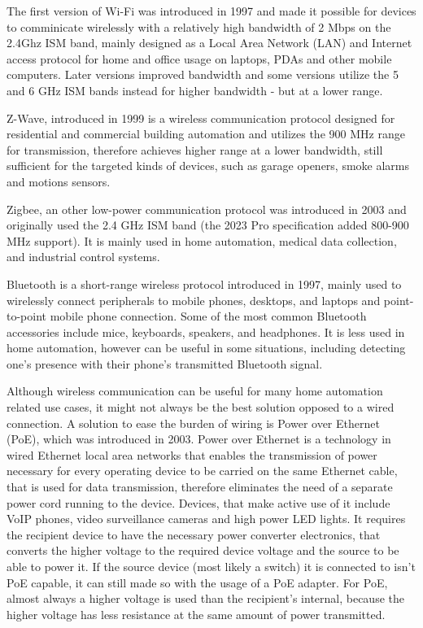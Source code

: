 The first version of Wi-Fi was introduced in 1997 and made it possible for devices to comminicate wirelessly with a relatively high bandwidth of 2 Mbps on the 2.4Ghz ISM band, mainly designed as a Local Area Network (LAN) and Internet access protocol for home and office usage on laptops, PDAs and other mobile computers. Later versions improved bandwidth and some versions utilize the 5 and 6 GHz ISM bands instead for higher bandwidth - but at a lower range. \cite{IEEEWiFi}

Z-Wave, introduced in 1999 is a wireless communication protocol designed for residential and commercial building automation and utilizes the 900 MHz range for transmission, therefore achieves higher range at a lower bandwidth, still sufficient for the targeted kinds of devices, such as garage openers, smoke alarms and motions sensors. \cite{PCMagZWave}

Zigbee, an other low-power communication protocol was introduced in 2003 and originally used the 2.4 GHz ISM band (the 2023 Pro specification added 800-900 MHz support). It is mainly used in home automation, medical data collection, and industrial control systems. \cite{DigiZigbee}

Bluetooth is a short-range wireless protocol introduced in 1997, mainly used to wirelessly connect peripherals to mobile phones, desktops, and laptops and point-to-point mobile phone connection. \cite{IntelBluetooth} Some of the most common Bluetooth accessories include mice, keyboards, speakers, and headphones. It is less used in home automation, however can be useful in some situations, including detecting one's presence with their phone's transmitted Bluetooth signal. %

Although wireless communication can be useful for many home automation related use cases, it might not always be the best solution opposed to a wired connection. A solution to ease the burden of wiring is Power over Ethernet (PoE), which was introduced in 2003. \cite{TTPoE} Power over Ethernet is a technology in wired Ethernet local area networks that enables the transmission of power necessary for every operating device to be carried on the same Ethernet cable, that is used for data transmission, therefore eliminates the need of a separate power cord running to the device. Devices, that make active use of it include VoIP phones, video surveillance cameras and high power LED lights. It requires the recipient device to have the necessary power converter electronics, that converts the higher voltage to the required device voltage and the source to be able to power it. If the source device (most likely a switch) it is connected to isn't PoE capable, it can still made so with the usage of a PoE adapter. For PoE, almost always a higher voltage is used than the recipient's internal, because the higher voltage has less resistance at the same amount of power transmitted.

